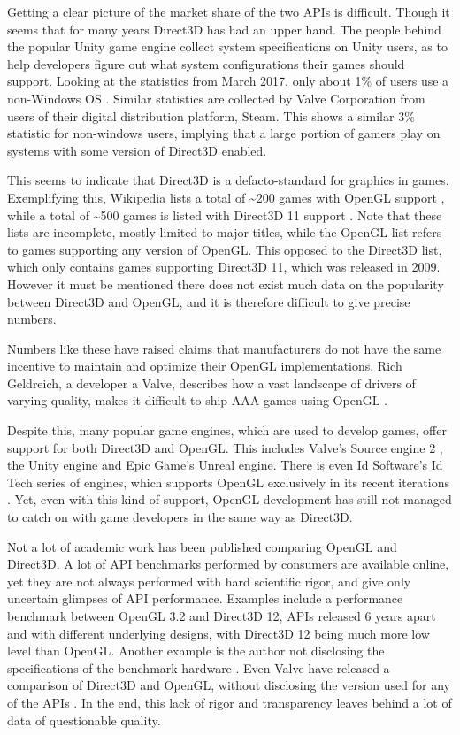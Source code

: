 Getting a clear picture of the market share of the two \glspl{API} is difficult.
Though it seems that for many years Direct3D has had an upper hand.
The people behind the popular Unity game engine collect system specifications on Unity users, as to help developers figure out what system configurations their games should support.
Looking at the statistics from March 2017, only about 1\% of users use a non-Windows \gls{OS} \cite{unityStats}.
Similar statistics are collected by Valve Corporation from users of their digital distribution platform, Steam.
This shows a similar 3\% statistic for non-windows users\cite{steamStats}, implying that a large portion of gamers play on systems with some version of Direct3D enabled.


This seems to indicate that Direct3D is a defacto-standard for graphics in games. 
Exemplifying this, Wikipedia lists a total of \textasciitilde{200} games with OpenGL support \cite{wikiOpenGLGames}, while a total of \textasciitilde{500} games is listed with Direct3D 11 support \cite{wikiDX11Games}. 
Note that these lists are incomplete, mostly limited to major titles, while the OpenGL list refers to games supporting any version of OpenGL.
This opposed to the Direct3D list, which only contains games supporting Direct3D 11, which was released in 2009.
However it must be mentioned there does not exist much data on the popularity between Direct3D and OpenGL, and it is therefore difficult to give precise numbers.
   
   
Numbers like these have raised claims that manufacturers do not have the same incentive to maintain and optimize their OpenGL implementations.
Rich Geldreich, a developer a Valve, describes how a vast landscape of drivers of varying quality, makes it difficult to ship AAA games using OpenGL \cite{openGLDriverQuality}.
 
 
Despite this, many popular game engines, which are used to develop games, offer support for both Direct3D and OpenGL.
This includes Valve’s Source engine 2 \cite{sourceEngine}, the Unity engine \cite{unityEngine} and Epic Game’s Unreal engine\cite{unrealEngine}.
There is even Id Software’s Id Tech series of engines, which supports OpenGL exclusively in its recent iterations \cite{idTech}.
Yet, even with this kind of support, OpenGL development has still not managed to catch on with game developers in the same way as Direct3D.  


Not a lot of academic work has been published comparing OpenGL and Direct3D.
A lot of \gls{API} benchmarks performed by consumers are available online, yet they are not always performed with hard scientific rigor, and give only uncertain glimpses of \gls{API} performance.
Examples include a performance benchmark between OpenGL 3.2 and Direct3D 12, \glspl{API} released 6 years apart and with different underlying designs, with Direct3D 12 being much more low level than OpenGL\cite{geek3DBenchmark}.
Another example is the author not disclosing the specifications of the benchmark hardware \cite{gTrucBenchmark}.
Even Valve have released a comparison of Direct3D and OpenGL, without disclosing the version used for any of the \glspl{API} \cite{valveBenchmark}.
In the end, this lack of rigor and transparency leaves behind a lot of data of questionable quality.


